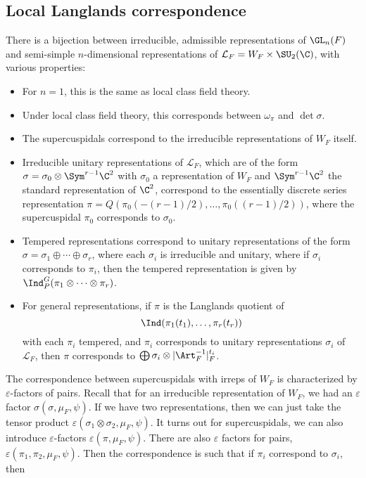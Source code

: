 \documentclass[a4paper]{article}
\begin{document}
\subsection{Local Langlands correspondence}
\begin{thm}
  There is a bijection between irreducible, admissible representations of $\GL_n(F)$ and semi-simple $n$-dimensional representations of $\mathcal{L}_F = W_F \times \SU_2(\C)$, with various properties:
  \begin{itemize}
    \item For $n = 1$, this is the same as local class field theory.
    \item Under local class field theory, this corresponds between $\omega_\pi$ and $\det \sigma$.
    \item The supercuspidals correspond to the irreducible representations of $W_F$ itself.
    \item Irreducible unitary representations of $\mathcal{L}_F$, which are of the form $\sigma = \sigma_0 \otimes \Sym^{r - 1} \C^2$ with $\sigma_0$ a representation of $W_F$ and $\Sym^{r - 1}\C^2$ the standard representation of $\C^2$, correspond to the essentially discrete series representation $\pi = Q(\pi_0(-(r-1)/2), \ldots, \pi_0((r - 1)/2))$, where the supercuspidal $\pi_0$ corresponds to $\sigma_0$.

    \item Tempered representations correspond to unitary representations of the form$\sigma = \sigma_1 \oplus \cdots \oplus \sigma_r$, where each $\sigma_i$ is irreducible and unitary, where if $\sigma_i$ corresponds to $\pi_i$, then the tempered representation is given by $\Ind_P^G(\pi_1 \otimes \cdots \otimes \pi_r)$.
    \item For general representations, if $\pi$ is the Langlands quotient of
      \[
        \Ind(\pi_1(t_1), \ldots, \pi_r(t_r))
      \]
      with each $\pi_i$ tempered, and $\pi_i$ corresponds to unitary representations $\sigma_i$ of $\mathcal{L}_F$, then $\pi$ corresponds to $\bigoplus \sigma_i \otimes |\Art_F^{-1}|_F^{t_i}$.
  \end{itemize}
\end{thm}
The correspondence between supercuspidals with irreps of $W_F$ is characterized by $\varepsilon$-factors of pairs. Recall that for an irreducible representation of $W_F$, we had an $\varepsilon$ factor $\sigma(\sigma, \mu_F, \psi)$. If we have two representations, then we can just take the tensor product $\varepsilon(\sigma_1 \otimes \sigma_2, \mu_F, \psi)$. It turns out for supercuspidals, we can also introduce $\varepsilon$-factors $\varepsilon(\pi, \mu_F, \psi)$. There are also $\varepsilon$ factors for pairs, $\varepsilon(\pi_1, \pi_2, \mu_F, \psi)$. Then the correspondence is such that if $\pi_i$ correspond to $\sigma_i$, then
\end{document}
